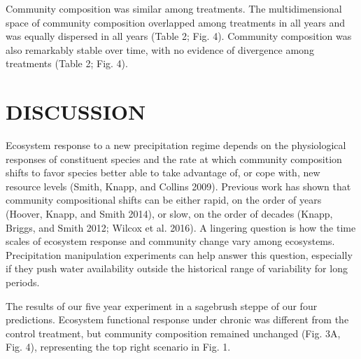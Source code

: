 \documentclass[fleqn,10pt,lineno]{wlpeerj} %
\begin{document}
Community composition was similar among treatments. The multidimensional
space of community composition overlapped among treatments in all years
and was equally dispersed in all years (Table 2; Fig. 4). Community
composition was also remarkably stable over time, with no evidence of
divergence among treatments (Table 2; Fig. 4).

\hypertarget{discussion}{%
\section{DISCUSSION}\label{discussion}}

Ecosystem response to a new precipitation regime depends on the
physiological responses of constituent species and the rate at which
community composition shifts to favor species better able to take
advantage of, or cope with, new resource levels (Smith, Knapp, and
Collins 2009). Previous work has shown that community compositional
shifts can be either rapid, on the order of years (Hoover, Knapp, and
Smith 2014), or slow, on the order of decades (Knapp, Briggs, and Smith
2012; Wilcox et al. 2016). A lingering question is how the time scales
of ecosystem response and community change vary among ecosystems.
Precipitation manipulation experiments can help answer this question,
especially if they push water availability outside the historical range
of variability for long periods.

The results of our five year experiment in a sagebrush steppe
 of our four predictions. Ecosystem
functional response under chronic  was different from the
control treatment, but community composition remained unchanged (Fig.
3A, Fig. 4), representing the top right scenario in Fig. 1.
\end{document}
